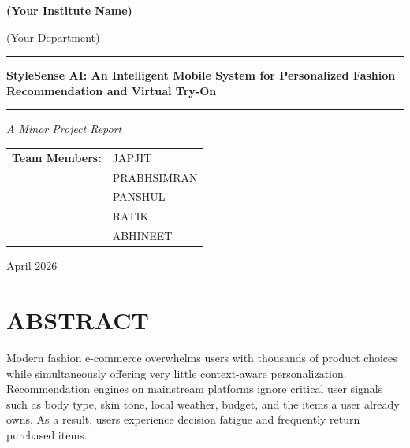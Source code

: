 \documentclass[12pt,a4paper]{report}
\newcommand{\ProjectTitle}{StyleSense AI: An Intelligent Mobile System for
  Personalized Fashion Recommendation and Virtual Try-On}
\newcommand{\TeamA}{JAPJIT}
\newcommand{\TeamB}{PRABHSIMRAN}
\newcommand{\TeamC}{PANSHUL}
\newcommand{\TeamD}{RATIK}
\newcommand{\TeamE}{ABHINEET}
\newcommand{\CourseName}{Minor Project}
\newcommand{\InstituteName}{(Your Institute Name)}
\newcommand{\DepartmentName}{(Your Department)}
\newcommand{\SubmissionMonthYear}{April 2026}
\begin{document}
\begin{titlepage}
  \centering
  \vspace*{1.2cm}
  {\Large \textbf{\InstituteName} \par}
  \vspace{0.3cm}
  {\large \DepartmentName \par}
  \vspace{1.2cm}
  \rule{\textwidth}{1.5pt}\par
  \vspace{0.4cm}
  {\Huge\bfseries \ProjectTitle \par}
  \vspace{0.4cm}
  \rule{\textwidth}{1.5pt}\par
  \vspace{0.8cm}
  {\large \textit{A \CourseName{} Report} \par}
  \vspace{1.4cm}

  \begin{tabular}{rl}
    \textbf{Team Members:} & \TeamA \\
                           & \TeamB \\
                           & \TeamC \\
                           & \TeamD \\
                           & \TeamE \\
  \end{tabular}

  \vfill
  {\large \SubmissionMonthYear \par}
\end{titlepage}


\tableofcontents
\listoffigures
\listoftables

\chapter*{ABSTRACT}

Modern fashion e-commerce overwhelms users with thousands of product choices while simultaneously offering very little context-aware personalization. Recommendation engines on mainstream platforms ignore critical user signals such as body type, skin tone, local weather, budget, and the items a user already owns. As a result, users experience decision fatigue and frequently return purchased items.
\end{document}
